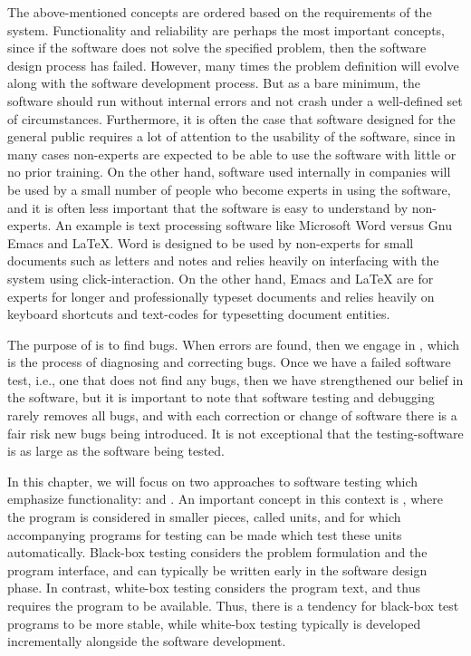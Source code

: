 \documentclass[fsharpNotes.tex]{subfiles}
\begin{document}
The above-mentioned concepts are ordered based on the requirements of the system. Functionality and reliability are perhaps the most important concepts, since if the software does not solve the specified problem, then the software design process has failed. However, many times the problem definition will evolve along with the software development process. But as a bare minimum, the software should run without internal errors and not crash under a well-defined set of circumstances. Furthermore, it is often the case that software designed for the general public requires a lot of attention to the usability of the software, since in many cases non-experts are expected to be able to use the software with little or no prior training. On the other hand, software used internally in companies will be used by a small number of people who become experts in using the software, and it is often less important that the software is easy to understand by non-experts. An example is text processing software like Microsoft Word versus Gnu Emacs and LaTeX. Word is designed to be used by non-experts for small documents such as letters and notes and relies heavily on interfacing with the system using click-interaction. On the other hand, Emacs and LaTeX are for experts for longer and professionally typeset documents and relies heavily on keyboard shortcuts and text-codes for typesetting document entities. 

The purpose of  is to find bugs. When errors are found, then we engage in , which is the process of diagnosing and correcting bugs. Once we have a failed software test, i.e., one that does not find any bugs, then we have strengthened our belief in the software, but it is important to note that software testing and debugging rarely removes all bugs, and with each correction or change of software there is a fair risk new bugs being introduced. It is not exceptional that the testing-software is as large as the software being tested.

In this chapter, we will focus on two approaches to software testing which emphasize functionality:  and . An important concept in this context is , where the program is considered in smaller pieces, called units, and for which accompanying programs for testing can be made which test these units automatically. Black-box testing considers the problem formulation and the program interface, and can typically be written early in the software design phase. In contrast, white-box testing considers the program text, and thus requires the program to be available. Thus, there is a tendency for black-box test programs to be more stable, while white-box testing typically is developed incrementally alongside the software development.
\end{document}
